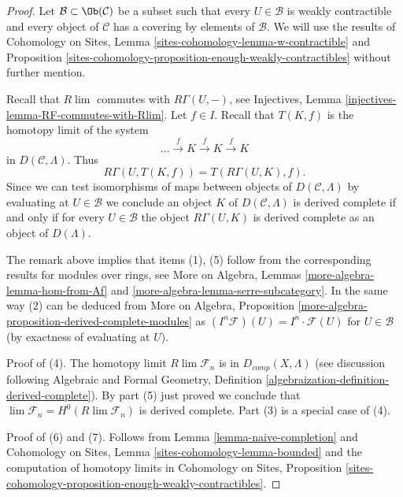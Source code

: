 \begin{proof}
Let $\mathcal{B} \subset \Ob(\mathcal{C})$ be a subset such that every
$U \in \mathcal{B}$ is weakly contractible and every object of $\mathcal{C}$
has a covering by elements of $\mathcal{B}$.
We will use the results of Cohomology on Sites,
Lemma \ref{sites-cohomology-lemma-w-contractible} and
Proposition \ref{sites-cohomology-proposition-enough-weakly-contractibles}
without further mention.

\medskip\noindent
Recall that $R\lim$ commutes with $R\Gamma(U, -)$,
see Injectives, Lemma \ref{injectives-lemma-RF-commutes-with-Rlim}.
Let $f \in I$. Recall that $T(K, f)$ is the homotopy limit
of the system
$$
\ldots \xrightarrow{f} K \xrightarrow{f} K \xrightarrow{f} K
$$
in $D(\mathcal{C}, \Lambda)$. Thus
$$
R\Gamma(U, T(K, f)) = T(R\Gamma(U, K), f).
$$
Since we can test isomorphisms of maps between objects of
$D(\mathcal{C}, \Lambda)$ by evaluating at $U \in \mathcal{B}$
we conclude an object $K$ of $D(\mathcal{C}, \Lambda)$
is derived complete if and only if for every $U \in \mathcal{B}$ the
object $R\Gamma(U, K)$ is derived complete as an object of $D(\Lambda)$.

\medskip\noindent
The remark above implies that items (1), (5) follow from the corresponding
results for modules over rings, see
More on Algebra, Lemmas \ref{more-algebra-lemma-hom-from-Af} and
\ref{more-algebra-lemma-serre-subcategory}.
In the same way (2) can be deduced from
More on Algebra, Proposition
\ref{more-algebra-proposition-derived-complete-modules}
as $(I^n\mathcal{F})(U) = I^n \cdot \mathcal{F}(U)$
for $U \in \mathcal{B}$ (by exactness of evaluating at $U$).

\medskip\noindent
Proof of (4). The homotopy limit $R\lim \mathcal{F}_n$ is in
$D_{comp}(X, \Lambda)$ (see discussion following
Algebraic and Formal Geometry, Definition
\ref{algebraization-definition-derived-complete}).
By part (5) just proved we conclude that
$\lim \mathcal{F}_n = H^0(R\lim \mathcal{F}_n)$
is derived complete.
Part (3) is a special case of (4).

\medskip\noindent
Proof of (6) and (7). Follows from
Lemma \ref{lemma-naive-completion}
and
Cohomology on Sites, Lemma \ref{sites-cohomology-lemma-bounded}
and the computation of homotopy limits in Cohomology on Sites,
Proposition \ref{sites-cohomology-proposition-enough-weakly-contractibles}.
\end{proof}






